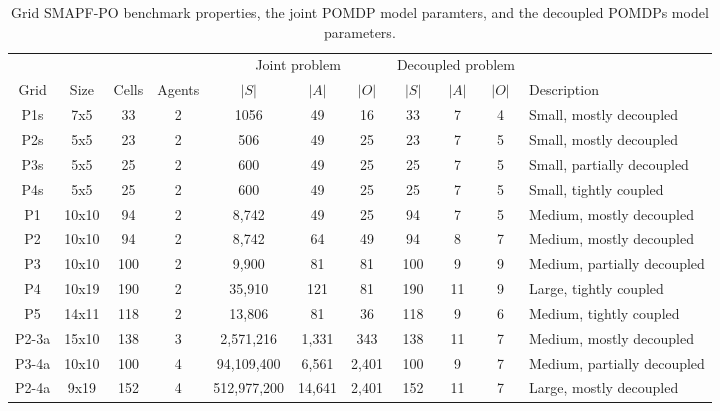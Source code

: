 \documentclass[letterpaper]{article} %
\begin{document}
\begin{table}[t]
\centering
\footnotesize
\begin{tabular}{@{}c|ccc|ccc|ccc|l@{}}
\toprule
        &       &       &      &\multicolumn{3}{c}{Joint problem}&\multicolumn{3}{c}{Decoupled problem}&\\
Grid  & Size  & Cells & Agents  & $|S|$ & $|A|$ &$|O|$& $|S|$ & $|A|$&$|O|$ & Description\\ \midrule
P1s   & 7x5   & 33    & 2       &  1056 & 49 & 16  & 33  & 7  & 4& Small, mostly decoupled \\
P2s   & 5x5   & 23    & 2       & 506  & 49  & 25& 23  & 7  & 5& Small, mostly decoupled \\
P3s   & 5x5   & 25    & 2       & 600  & 49  & 25 &  25 &  7 & 5&Small, partially decoupled    \\
P4s   & 5x5   & 25    & 2       & 600  & 49  & 25 &25 &7  & 5  & Small, tightly coupled  \\ \midrule
P1    & 10x10 & 94    & 2       &  8,742 &  49 & 25  &  94 &  7 & 5  & Medium, mostly decoupled  \\
P2    & 10x10 & 94    & 2       & 8,742  &  64 &  49 & 94  & 8  &  7 & Medium, mostly decoupled  \\
P3    & 10x10 & 100   & 2       & 9,900  &  81 &  81 &  100 &  9 &  9 & Medium, partially decoupled \\
P4    & 10x19 & 190   & 2       &  35,910 & 121  & 81  & 190  & 11  & 9  & Large, tightly coupled    \\
P5    & 14x11 & 118   & 2       & 13,806  &  81 & 36  & 118  &  9 & 6  & Medium, tightly coupled       \\ \midrule
P2-3a & 15x10 & 138   & 3       &  2,571,216 &  1,331 &  343 &  138 &  11 &  7 & Medium, mostly decoupled    \\
P3-4a & 10x10 & 100   & 4       & 94,109,400  &  6,561 & 2,401  & 100  &  9 & 7  & Medium, partially decoupled \\
P2-4a & 9x19  & 152   & 4       & 512,977,200  &  14,641 &  2,401 &  152 & 11  &  7 & Large, mostly decoupled \\ \bottomrule
\end{tabular}

\caption{Grid SMAPF-PO benchmark properties, the joint POMDP model paramters, and the decoupled POMDPs model parameters.}
\label{tab:benchmark}
\end{table}
\end{document}
